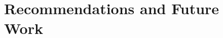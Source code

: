 \documentclass{erauthesis}
\begin{document}
% 

% 

% 


\chapter{Recommendations and Future Work} \label{chap:recommendations}
% 


\end{document}
